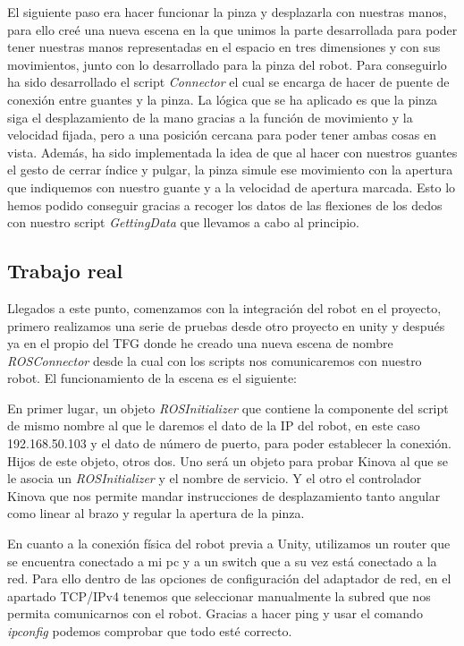  El siguiente paso era hacer funcionar la pinza y desplazarla con nuestras manos, para ello creé una nueva escena en la que unimos la parte desarrollada para poder tener nuestras manos representadas en el espacio en tres dimensiones y con sus movimientos, junto con lo desarrollado para la pinza del robot. Para conseguirlo ha sido desarrollado el script \textit{Connector} el cual se encarga de hacer de puente de conexión entre guantes y la pinza. La lógica que se ha aplicado es que la pinza siga el desplazamiento de la mano gracias a la función de movimiento y la velocidad fijada, pero a una posición cercana para poder tener ambas cosas en vista. Además, ha sido implementada la idea de que al hacer con nuestros guantes el gesto de cerrar índice y pulgar, la pinza simule ese movimiento con la apertura que indiquemos con nuestro guante y a la velocidad de apertura marcada. Esto lo hemos podido conseguir gracias a recoger los datos de las flexiones de los dedos con nuestro script \textit{GettingData} que llevamos a cabo al principio.
 
 \subsection{Trabajo real}
Llegados a este punto, comenzamos con la integración del robot en el proyecto, primero realizamos una serie de pruebas desde otro proyecto en unity y después ya en el propio del TFG donde he creado una nueva escena de nombre \textit{ROSConnector} desde la cual con los scripts nos comunicaremos con nuestro robot. El funcionamiento de la escena es el siguiente:

En primer lugar, un objeto \textit{ROSInitializer} que contiene la componente del script de mismo nombre al que le daremos el dato de la IP del robot, en este caso 192.168.50.103 y el dato de número de puerto, para poder establecer la conexión. Hijos de este objeto, otros dos. Uno será un objeto para probar Kinova al que se le asocia un \textit{ROSInitializer} y el nombre de servicio. Y el otro el controlador Kinova que nos permite mandar instrucciones de desplazamiento tanto angular como linear al brazo y regular la apertura de la pinza. 

En cuanto a la conexión física del robot previa a Unity, utilizamos un router que se encuentra conectado a mi pc y a un switch que a su vez está conectado a la red. Para ello dentro de las opciones de configuración del adaptador de red, en el apartado TCP/IPv4 tenemos que seleccionar manualmente la subred que nos permita comunicarnos con el robot. Gracias a hacer ping y usar el comando \textit{ipconfig} podemos comprobar que todo esté correcto.

